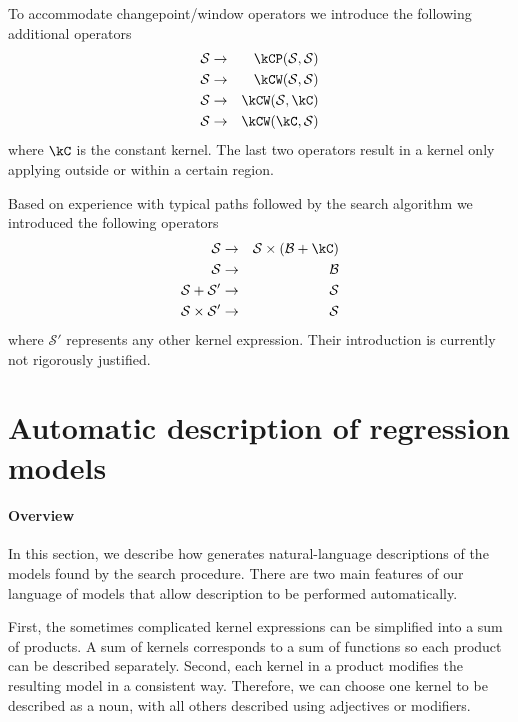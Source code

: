 To accommodate changepoint/window operators we introduce the following additional operators
%
\begin{eqnarray}
\mathcal{S} &\to& \kCP(\mathcal{S},\mathcal{S}) \\
\mathcal{S} &\to& \kCW(\mathcal{S},\mathcal{S}) \\
\mathcal{S} &\to& \kCW(\mathcal{S},\kC) \\
\mathcal{S} &\to& \kCW(\kC,\mathcal{S})
\end{eqnarray}
%
where $\kC$ is the constant kernel.
The last two operators result in a kernel only applying outside or within a certain region.

Based on experience with typical paths followed by the search algorithm we introduced the following operators
%
\begin{eqnarray}
\mathcal{S} &\to& \mathcal{S} \times (\mathcal{B} + \kC)\\
\mathcal{S} &\to& \mathcal{B}\\
\mathcal{S} + \mathcal{S'} &\to& \mathcal{S}\\
\mathcal{S} \times \mathcal{S'} &\to& \mathcal{S}
\end{eqnarray}
%
where $\mathcal{S'}$ represents any other kernel expression.
Their introduction is currently not rigorously justified.

\section{Automatic description of regression models}
\label{sec:description:description}

\paragraph{Overview}

In this section, we describe how \procedurename{} generates natural-language descriptions of the models found by the search procedure.
There are two main features of our language of \gp{} models that allow description to be performed automatically.

First, the sometimes complicated kernel expressions can be simplified into a sum of products.
A sum of kernels corresponds to a sum of functions so each product can be described separately.
Second, each kernel in a product modifies the resulting model in a consistent way.
Therefore, we can choose one kernel to be described as a noun, with all others described using adjectives or modifiers.

